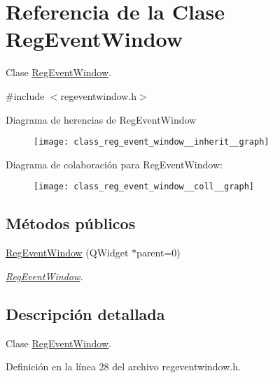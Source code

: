 \hypertarget{class_reg_event_window}{}\section{Referencia de la Clase Reg\+Event\+Window}
\label{class_reg_event_window}


Clase \hyperlink{class_reg_event_window}{Reg\+Event\+Window}.  




{\ttfamily \#include $<$regeventwindow.\+h$>$}



Diagrama de herencias de Reg\+Event\+Window\nopagebreak
\begin{figure}[H]
\begin{center}
\leavevmode
\texttt{[image: class\_reg\_event\_window\_\_inherit\_\_graph]}
\end{center}
\end{figure}


Diagrama de colaboración para Reg\+Event\+Window\+:\nopagebreak
\begin{figure}[H]
\begin{center}
\leavevmode
\texttt{[image: class\_reg\_event\_window\_\_coll\_\_graph]}
\end{center}
\end{figure}
\subsection*{Métodos públicos}
\begin{DoxyCompactItemize}
\item 
\hyperlink{class_reg_event_window_a2985bc88d5498d00e66bd124d007dc2c}{Reg\+Event\+Window} (Q\+Widget $\ast$parent=0)
\begin{DoxyCompactList}\small\item\em \hyperlink{class_reg_event_window}{Reg\+Event\+Window}. \end{DoxyCompactList}\end{DoxyCompactItemize}


\subsection{Descripción detallada}
Clase \hyperlink{class_reg_event_window}{Reg\+Event\+Window}. 

Definición en la línea 28 del archivo regeventwindow.\+h.



